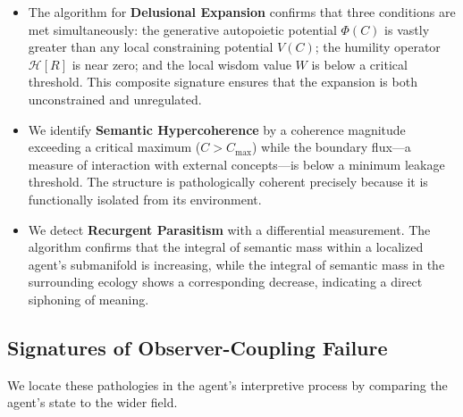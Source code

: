 \begin{itemize}

    \item The algorithm for \textbf{Delusional Expansion} confirms that three conditions are met simultaneously: the generative autopoietic potential \(\Phi(C)\) is vastly greater than any local constraining potential \(V(C)\); the humility operator \(\mathcal{H}[R]\) is near zero; and the local wisdom value \(W\) is below a critical threshold. This composite signature ensures that the expansion is both unconstrained and unregulated.

    \item We identify \textbf{Semantic Hypercoherence} by a coherence magnitude exceeding a critical maximum (\(C > C_{\text{max}}\)) while the boundary flux—a measure of interaction with external concepts—is below a minimum leakage threshold. The structure is pathologically coherent precisely because it is functionally isolated from its environment.

    \item We detect \textbf{Recurgent Parasitism} with a differential measurement. The algorithm confirms that the integral of semantic mass within a localized agent's submanifold is increasing, while the integral of semantic mass in the surrounding ecology shows a corresponding decrease, indicating a direct siphoning of meaning.

\end{itemize}


\subsection{Signatures of Observer-Coupling Failure}
\label{16.2.4:signatures_of_observer_coupling_failure}

We locate these pathologies in the agent's interpretive process by comparing the agent's state to the wider field.

